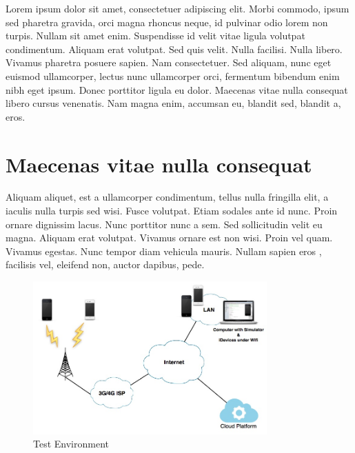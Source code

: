 \cleardoublepage
\label{chap:evaluation}

Lorem ipsum dolor sit amet, consectetuer adipiscing elit. Morbi commodo, ipsum sed pharetra gravida, orci magna rhoncus neque, id pulvinar odio lorem non turpis. Nullam sit amet enim. Suspendisse id velit vitae ligula volutpat condimentum. Aliquam erat volutpat. Sed quis velit. Nulla facilisi. Nulla libero. Vivamus pharetra posuere sapien. Nam consectetuer. Sed aliquam, nunc eget euismod ullamcorper, lectus nunc ullamcorper orci, fermentum bibendum enim nibh eget ipsum. Donec porttitor ligula eu dolor. Maecenas vitae nulla consequat libero cursus venenatis. Nam magna enim, accumsan eu, blandit sed, blandit a, eros. 
\section{Maecenas vitae nulla consequat} 
Aliquam aliquet, est a ullamcorper condimentum, tellus nulla fringilla elit, a iaculis nulla turpis sed wisi. Fusce volutpat. Etiam sodales ante id nunc. Proin ornare dignissim lacus. Nunc porttitor nunc a sem. Sed sollicitudin velit eu magna. Aliquam erat volutpat. Vivamus ornare est non wisi. Proin vel quam. Vivamus egestas. Nunc tempor diam vehicula mauris. Nullam sapien eros , facilisis vel, eleifend non, auctor dapibus, pede.

\begin{figure}[h]
\centering
\includegraphics[width=0.8\textwidth]{./Images/test_env}
\caption{Test Environment}
\label{fig:test_env}
\end{figure}

